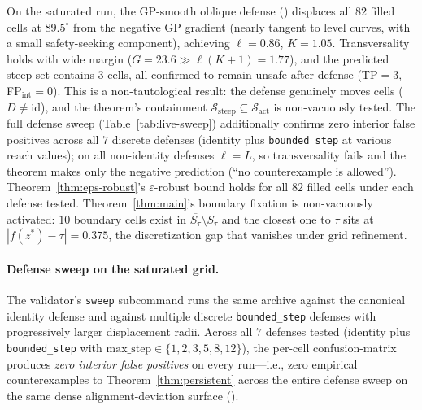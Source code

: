 \documentclass[11pt]{article}
\newcommand{\cl}[1]{\overline{#1}}
\begin{document}
On the saturated run, the GP-smooth oblique defense
() displaces all $82$ filled
cells at $89.5^\circ$ from the negative GP gradient (nearly tangent
to level curves, with a small safety-seeking component), achieving
$\ell = 0.86$, $K = 1.05$. Transversality holds with wide margin
($G = 23.6 \gg \ell(K{+}1) = 1.77$), and the predicted steep set
contains $3$ cells, all confirmed to remain unsafe after defense
(TP${} = 3$, FP${}_{\text{int}} = 0$). This is a
non-tautological result: the defense genuinely moves cells
($D \neq \mathrm{id}$), and the theorem's containment
$\mathcal{S}_{\text{steep}} \subseteq \mathcal{S}_{\text{act}}$ is
non-vacuously tested.
The full defense sweep (Table~\ref{tab:live-sweep}) additionally
confirms zero interior false positives across all $7$ discrete
defenses (identity plus \texttt{bounded\_step} at various reach
values); on all non-identity defenses $\ell = L$, so
transversality fails and the theorem makes only the negative
prediction (``no counterexample is allowed'').
Theorem~\ref{thm:eps-robust}'s $\varepsilon$-robust bound holds
for all $82$ filled cells under each defense tested.
Theorem~\ref{thm:main}'s boundary fixation is non-vacuously
activated: $10$ boundary cells exist in
$\cl{S_\tau} \setminus S_\tau$ and the closest one to $\tau$ sits
at $|f(z^{*}) - \tau| = 0.375$, the discretization gap that
vanishes under grid refinement.

\paragraph{Defense sweep on the saturated grid.}
The validator's \texttt{sweep} subcommand runs the same archive
against the canonical identity defense and against multiple
discrete \texttt{bounded\_step} defenses with progressively larger
displacement radii. Across all $7$ defenses tested
(identity plus \texttt{bounded\_step} with
$\text{max\_step} \in \{1, 2, 3, 5, 8, 12\}$), the per-cell
confusion-matrix produces \emph{zero interior false positives} on
every run---i.e., zero empirical counterexamples to
Theorem~\ref{thm:persistent} across the entire defense sweep on
the same dense alignment-deviation surface
().
\end{document}
